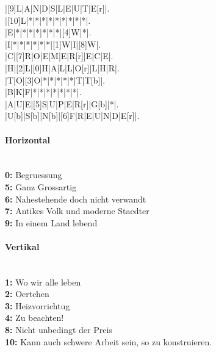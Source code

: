 \documentclass{article}
\begin{document}
\begin{Puzzle}{10}{10}%
|[9]L|A|N|D|S|L|E|U|T|E[r]|.\\
|[10]L|*|*|*|*|*|*|*|*|*|.\\
|E|*|*|*|*|*|*|*|[4]W|*|.\\
|I|*|*|*|*|*|*|[1]W|I|[8]W|.\\
|C|[7]R|O|E|M|E|R[r]|E|C|E|.\\
|H|[2]L|[0]H|A|L|L|O[r]|L|H|R|.\\
|T|O|[3]O|*|*|*|*|*|T|T[b]|.\\
|B|K|F|*|*|*|*|*|*|*|.\\
|A|U|E|[5]S|U|P|E|R[r]|G[b]|*|.\\
|U[b]|S[b]|N[b]|[6]F|R|E|U|N|D|E[r]|.\\
\end{Puzzle}

\paragraph*{Horizontal}~\\
{\bfseries 0: }Begruessung\\
{\bfseries 5: }Ganz Grossartig\\
{\bfseries 6: }Nahestehende doch nicht verwandt\\
{\bfseries 7: }Antikes Volk und moderne Staedter\\
{\bfseries 9: }In einem Land lebend\\
\paragraph*{Vertikal}~\\
{\bfseries 1: }Wo wir alle leben\\
{\bfseries 2: }Oertchen\\
{\bfseries 3: }Heizvorrichtug\\
{\bfseries 4: }Zu beachten!\\
{\bfseries 8: }Nicht unbedingt der Preis\\
{\bfseries 10: }Kann auch schwere Arbeit sein, so zu konstruieren.\\
\end{document}
